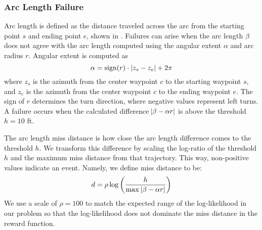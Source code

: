 \subsubsection{Arc Length Failure}
Arc length is defined as the distance traveled across the arc from the starting point $s$ and ending point $e$, shown in .
Failures can arise when the arc length $\beta$ does not agree with the arc length computed using the angular extent $\alpha$ and arc radius $r$.
Angular extent is computed as
\begin{equation}
  \alpha = \operatorname{sign}(r) \cdot |z_s - z_e| + 2\pi
\end{equation}
where $z_s$ is the azimuth from the center waypoint $c$ to the starting waypoint $s$, and $z_e$ is the azimuth from the center waypoint $c$ to the ending waypoint $e$.
The sign of $r$ determines the turn direction, where negative values represent left turns.
A failure occurs when the calculated difference $\abs{\beta - \alpha r}$ is above the threshold $h=10$ \si{ft}. 



The arc length miss distance is how close the arc length difference comes to the threshold $h$.
We transform this difference by scaling the log-ratio of the threshold $h$ and the maximum miss distance from that trajectory.
This way, non-positive values indicate an event.
Namely, we define miss distance to be:
\begin{equation} \label{eq:miss}
  d = \rho\log\left(\frac{h}{\max\,\abs{\beta - \alpha r}}\right)
\end{equation}
We use a scale of $\rho=100$ to match the expected range of the log-likelihood in our problem so that the log-likelihood does not dominate the miss distance in the reward function.  


